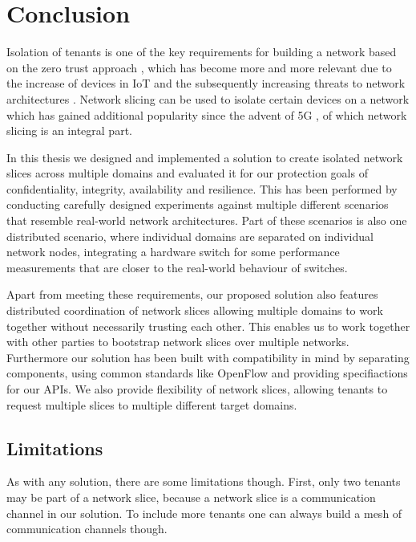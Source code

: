 \chapter{Conclusion}
\label{conclusion}
\iffalse
\begin{itemize}
    \item Summary
    \item Limitations
    \item Future work
\end{itemize}
\fi

Isolation of tenants is one of the key requirements for building a network based on the zero trust approach \cite{zerotrust}, which has become more and more relevant due to the increase of devices in IoT \cite{iotincrease} and the subsequently increasing threats to network architectures \cite{iotthreats}. Network slicing can be used to isolate certain devices on a network which has gained additional popularity since the advent of 5G \cite{5G1, 5G2, 5G3}, of which network slicing is an integral part.

In this thesis we designed and implemented a solution to create isolated network slices across multiple domains and evaluated it for our protection goals of confidentiality, integrity, availability and resilience. This has been performed by conducting carefully designed experiments against multiple different scenarios that resemble real-world network architectures. Part of these scenarios is also one distributed scenario, where individual domains are separated on individual network nodes, integrating a hardware switch for some performance measurements that are closer to the real-world behaviour of switches.

Apart from meeting these requirements, our proposed solution also features distributed coordination of network slices allowing multiple domains to work together without necessarily trusting each other. This enables us to work together with other parties to bootstrap network  slices over multiple networks. Furthermore our solution has been built with compatibility in mind by separating components, using common standards like OpenFlow and providing specifiactions for our APIs. We also provide flexibility of network slices, allowing tenants to request multiple slices to multiple different target domains.

\section{Limitations}
As with any solution, there are some limitations though. First, only two tenants may be part of a network slice, because a network slice is a communication channel in our solution. To include more tenants one can always build a mesh of communication channels though.

